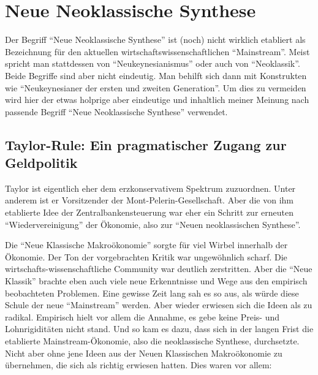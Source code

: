 %
%
%

\chapter{Neue Neoklassische Synthese}
\label{Neue Neoklassische Synthese}

Der Begriff "`Neue Neoklassische Synthese"' ist (noch) nicht wirklich etabliert als Bezeichnung für den aktuellen wirtschaftswissenschaftlichen "`Mainstream"'. Meist spricht man stattdessen von "`Neukeynesianismus"' oder auch von "`Neoklassik"'. Beide Begriffe sind aber nicht eindeutig. Man behilft sich dann mit Konstrukten wie "`Neukeynesianer der ersten und zweiten Generation"'. Um dies zu vermeiden wird hier der etwas holprige aber eindeutige und inhaltlich meiner Meinung nach passende Begriff "`Neue Neoklassische Synthese"' verwendet.



\section{Taylor-Rule: Ein pragmatischer Zugang zur Geldpolitik}
Taylor ist eigentlich eher dem erzkonservativem Spektrum zuzuordnen. Unter anderem ist er Vorsitzender der Mont-Pelerin-Gesellschaft. Aber die von ihm etablierte Idee der Zentralbankensteuerung war eher ein Schritt zur erneuten "`Wiedervereinigung"' der Ökonomie, also zur "`Neuen neoklassischen Synthese"'.

Die "`Neue Klassische Makroökonomie"' sorgte für viel Wirbel innerhalb der Ökonomie. Der Ton der vorgebrachten Kritik war ungewöhnlich scharf. Die wirtschafts-wissenschaftliche Community war deutlich zerstritten. Aber die "`Neue Klassik"' brachte eben auch viele neue Erkenntnisse und Wege aus den empirisch beobachteten Problemen. Eine gewisse Zeit lang sah es so aus, als würde diese Schule der neue "`Mainstream"' werden. Aber wieder erwiesen sich die Ideen als zu radikal. Empirisch hielt vor allem die Annahme, es gebe keine Preis- und Lohnrigiditäten nicht stand.
Und so kam es dazu, dass sich in der langen Frist die etablierte Mainstream-Ökonomie, also die neoklassische Synthese, durchsetzte. Nicht aber ohne jene Ideen aus der Neuen Klassischen Makroökonomie zu übernehmen, die sich als richtig erwiesen hatten. Dies waren vor allem:

